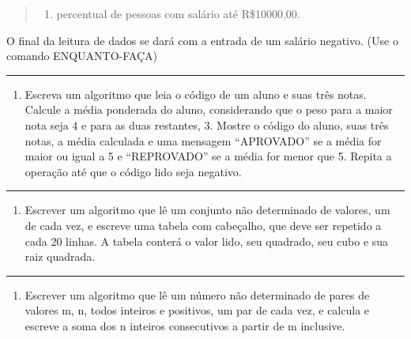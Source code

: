 \documentclass[12pt,a4paper]{article}
\renewcommand{\linethickness}{0.05em}
\providecommand{\tightlist}{%
      \setlength{\itemsep}{0pt}\setlength{\parskip}{0pt}}
\begin{document}
\begin{quote}
\begin{enumerate}
\def\labelenumi{\alph{enumi})}
\setcounter{enumi}{3}
\tightlist
\item
  percentual de pessoas com salário até R\$10000,00.
\end{enumerate}
\end{quote}

O final da leitura de dados se dará com a entrada de um salário
negativo. (Use o comando ENQUANTO-FAÇA)

    \begin{center}\rule{0.5\linewidth}{\linethickness}\end{center}

\begin{enumerate}
\def\labelenumi{\arabic{enumi}.}
\setcounter{enumi}{5}
\tightlist
\item
  Escreva um algoritmo que leia o código de um aluno e suas três notas.
  Calcule a média ponderada do aluno, considerando que o peso para a
  maior nota seja 4 e para as duas restantes, 3. Mostre o código do
  aluno, suas três notas, a média calculada e uma mensagem ``APROVADO''
  se a média for maior ou igual a 5 e ``REPROVADO'' se a média for menor
  que 5. Repita a operação até que o código lido seja negativo.
\end{enumerate}

    \begin{center}\rule{0.5\linewidth}{\linethickness}\end{center}

\begin{enumerate}
\def\labelenumi{\arabic{enumi}.}
\setcounter{enumi}{6}
\tightlist
\item
  Escrever um algoritmo que lê um conjunto não determinado de valores,
  um de cada vez, e escreve uma tabela com cabeçalho, que deve ser
  repetido a cada 20 linhas. A tabela conterá o valor lido, seu
  quadrado, seu cubo e sua raiz quadrada.
\end{enumerate}

    \begin{center}\rule{0.5\linewidth}{\linethickness}\end{center}

\begin{enumerate}
\def\labelenumi{\arabic{enumi}.}
\setcounter{enumi}{7}
\tightlist
\item
  Escrever um algoritmo que lê um número não determinado de pares de
  valores m, n, todos inteiros e positivos, um par de cada vez, e
  calcula e escreve a soma dos n inteiros consecutivos a partir de m
  inclusive.
\end{enumerate}
\end{document}
